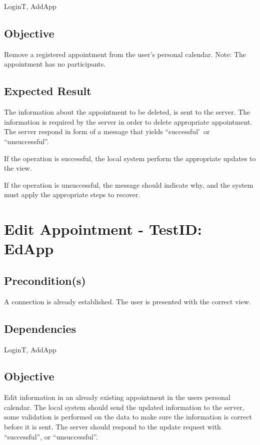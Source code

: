 \documentclass{article}
\begin{document}
LoginT, AddApp

\subsection{Objective}

Remove a registered appointment from the user's personal calendar. Note: The
appointment has no participants.

\subsection{Expected Result}

The information about the appointment to be deleted, is sent to the server.
The information is required by the server in order to delete appropriate
appointment. The server respond in form of a message that yields
``successful'\ or ``unsuccessful''.

If the operation is successful, the local system perform the appropriate
updates to the view.

If the operation is unsuccessful, the message should indicate why, and the
system must apply the appropriate steps to recover. \newpage

\section{Edit Appointment - TestID: EdApp}

\subsection{Precondition(s)}

A connection is already established. The user is presented with the correct
view.

\subsection{Dependencies}

LoginT, AddApp

\subsection{Objective}

Edit information in an already existing appointment in the users personal
calendar. The local system should send the updated information to the
server, some validation is performed on the data to make sure the
information is correct before it is sent. The server should respond to the
update request with ``successful'', or ``unsuccessful''.
\end{document}
